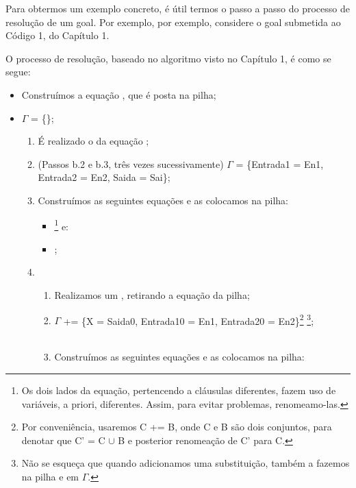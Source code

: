 Para obtermos um exemplo concreto, é útil termos o passo a passo do processo de resolução de um goal. Por exemplo, por exemplo, considere o goal  submetida ao Código 1, do Capítulo 1.

O processo de resolução, baseado no algoritmo visto no Capítulo 1, é como se segue:

\begin{itemize}
  \item Construímos a equação , que é posta na pilha;
  \item $\Gamma$ = \{\};
    \begin{enumerate}
      \item É realizado o  da equação ;
      \item (Passos b.2 e b.3, três vezes sucessivamente) $\Gamma$ = \{Entrada1 = En1, Entrada2 = En2, Saida = Sai\}; %
      \item Construímos as seguintes equações e as colocamos na pilha:
        \begin{itemize}
          \item {}\footnote{Os dois lados da equação, pertencendo a cláusulas diferentes, fazem uso de variáveis, a priori, diferentes. Assim, para evitar problemas, renomeamo-las.} e:
          \item {};
        \end{itemize}
      \item
        \begin{enumerate}
          \item Realizamos um , retirando a equação  da pilha;
          \item $\Gamma$ += \{X = Saida0, Entrada10 = En1, Entrada20 = En2\}\footnote{Por conveniência, usaremos C += B, onde C e B são dois conjuntos, para denotar que C' = C $\cup$ B e posterior renomeação de C' para C.} \footnote{Não se esqueça que quando adicionamos uma substituição, também a fazemos na pilha e em $\Gamma$.};
          \item Construímos as seguintes equações e as colocamos na pilha:
            \begin{itemize}

\end{itemize}
\end{enumerate}
\end{enumerate}
\end{itemize}
